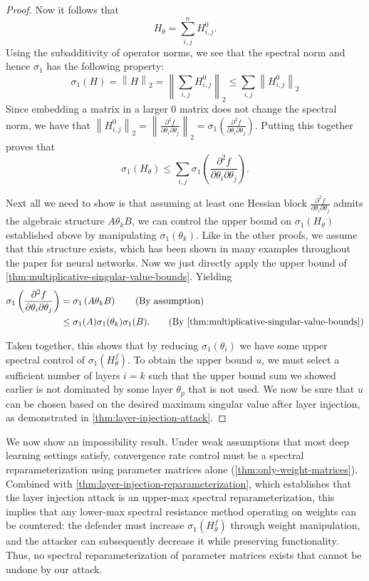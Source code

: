 \documentclass{article}
\theoremstyle{plain}
\theoremstyle{definition}
\theoremstyle{remark}
\begin{document}
\begin{proof}
Now it follows that
\[
H_{\theta} = \sum_{i,j}^{n} H_{i,j}^0.
\]
Using the subadditivity of operator norms, we see that the spectral norm and hence $\sigma_1$ has the following property: \[
 \sigma_1\left( H \right) = \left\|H\right\|_2 = \left\|\sum_{i,j} H_{i,j}^0\right\|_2 \leq \sum_{i,j} \left\|H_{i,j}^0\right\|_2
\]
Since embedding a matrix in a larger 0 matrix does not change the spectral norm, we have that $\left\|H_{i,j}^0\right\|_2 = \left\|\frac{\partial^2 f}{
\partial \theta_i \partial \theta_j
}\right\|_2 = \sigma_1\left(\frac{\partial^2 f}{
\partial \theta_i \partial \theta_j
} \right)$. Putting this together proves that \[
\sigma_1(H_{\theta}) \leq \sum_{i,j}\sigma_1 \left(\frac{\partial^2 f}{
\partial \theta_i \partial \theta_j
} \right).
\]


Next all we need to show is that assuming at least one Hessian block $\frac{\partial^2 f}{\partial \theta_i \partial \theta_j}$ admits the algebraic structure $A\theta_kB$, we can control the upper bound on $\sigma_1(H_{\theta})$ established above by manipulating $\sigma_1(\theta_k)$. Like in the other proofs, we assume that this structure exists, which has been shown in many examples throughout the paper for neural networks. Now we just directly apply the upper bound of \cref{thm:multiplicative-singular-value-bounds}. Yielding \begin{align}
\sigma_1 \left(\frac{\partial^2 f}{
\partial \theta_i \partial \theta_j
} \right) &= \sigma_1 \left(A\theta_kB\right) \tag{By assumption} \\
&\leq \sigma_1(A)\sigma_1(\theta_k)\sigma_1(B). \tag{By \cref{thm:multiplicative-singular-value-bounds}}
\end{align}

Taken together, this shows that by reducing $\sigma_1(\theta_i)$  we have some upper spectral control of $\sigma_1(H^f_{\theta})$. To obtain the upper bound $u$, we must select a sufficient number of layers $i=k$ such that the upper bound sum we showed earlier is not dominated by some layer $\theta_p$ that is not used. We now be sure that $u$ can be chosen based on the desired maximum singular value after layer injection, as demonstrated in \cref{thm:layer-injection-attack}.
\end{proof}

We now show an impossibility result. Under weak assumptions that most deep learning settings satisfy, convergence rate control must be a 
spectral reparameterization using parameter matrices alone 
(\cref{thm:only-weight-matrices}). Combined with \cref{thm:layer-injection-reparameterization}, 
which establishes that the layer injection attack is an upper-max spectral reparameterization, this implies that any lower-max spectral resistance method 
operating on weights can be countered: the defender must increase $\sigma_1(H^f_{\theta})$ through weight manipulation, and the attacker can subsequently decrease it while preserving functionality. Thus, no spectral reparameterization of parameter matrices exists that cannot be undone by our attack.
\end{document}
